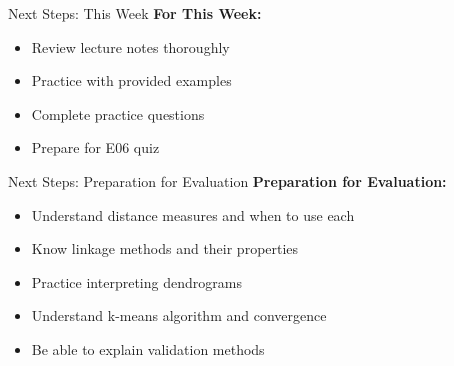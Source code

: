 \documentclass[aspectratio=169,ignorenonframetext]{beamer}
\begin{document}
\begin{frame}{Next Steps: This Week}
\textbf{For This Week:}

\begin{itemize}
\item
  Review lecture notes thoroughly
\item
  Practice with provided examples
\item
  Complete practice questions
\item
  Prepare for E06 quiz
\end{itemize}
\end{frame}

\begin{frame}{Next Steps: Preparation for Evaluation}
\textbf{Preparation for Evaluation:}

\begin{itemize}
\item
  Understand distance measures and when to use each
\item
  Know linkage methods and their properties
\item
  Practice interpreting dendrograms
\item
  Understand k-means algorithm and convergence
\item
  Be able to explain validation methods
\end{itemize}
\end{frame}
\end{document}
